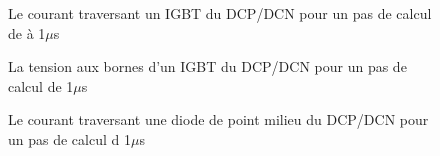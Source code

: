 \begin{figure}[htb]
\caption{Le courant traversant un IGBT du DCP/DCN pour un pas de calcul de à 1$\mu$s}
\label{AF_DC_HAA1}
\end{figure}



\begin{figure}[htb]
\caption{La tension aux bornes d'un IGBT du DCP/DCN pour un pas de calcul de 1$\mu$s}
\label{AF_DC_HAV1}
\end{figure}



\begin{figure}[htb]
\caption{Le courant traversant une diode de point milieu du DCP/DCN pour un pas de calcul d 1$\mu$s}
\label{AF_DC_HA1}
\end{figure}


